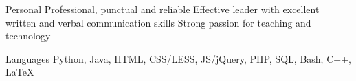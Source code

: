 


\begin{cvskills}


\cvskill
{Personal} %
{Professional, punctual and reliable}
\cvskill
{} %
{Effective leader with excellent written and verbal communication skills}
\cvskill
{} %
{Strong passion for teaching and technology} 

\cvskill
{Languages} %
{Python, Java, HTML, CSS/LESS, JS/jQuery, PHP, SQL, Bash, C++, LaTeX} %


\end{cvskills}